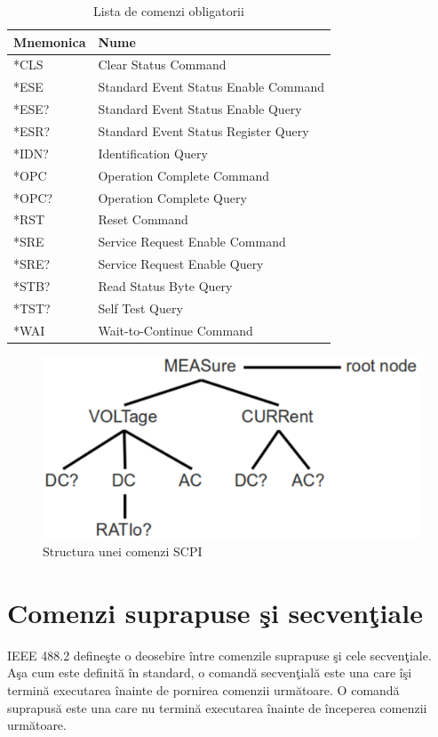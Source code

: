 \begin{table}[h]
	\begin{center}
	\begin{tabular}{|l|l|}
		\hline
		Mnemonica & Nume\\
		\hline
		*CLS & Clear Status Command\\
		*ESE & Standard Event Status Enable Command\\
		*ESE? & Standard Event Status Enable Query\\
		*ESR? & Standard Event Status Register Query\\
		*IDN? & Identification Query\\
		*OPC & Operation Complete Command\\
		*OPC? & Operation Complete Query\\
		*RST & Reset Command\\
		*SRE & Service Request Enable Command\\
		*SRE? & Service Request Enable Query\\
		*STB? & Read Status Byte Query\\
		*TST? & Self Test Query\\
		*WAI & Wait-to-Continue Command\\
		\hline
	\end{tabular}
	\end{center}
	\caption{Lista de comenzi obligatorii}
\end{table}

\begin{figure}[!htb]
	\centering
	\includegraphics[scale=0.8]{./Figuri/structuracomanda.eps}
	\caption{Structura unei comenzi SCPI}
	\label{structuracomanda}
\end{figure}

\section{Comenzi suprapuse \c{s}i secven\c{t}iale}
IEEE 488.2 define\c{s}te o deosebire \^{i}ntre comenzile suprapuse \c{s}i cele secven\c{t}iale. A\c{s}a cum este definit\u{a} \^{i}n standard, o comand\u{a} secven\c{t}ial\u{a} este una care \^{i}\c{s}i termin\u{a} executarea \^{i}nainte de pornirea comenzii urm\u{a}toare. O comand\u{a} suprapus\u{a} este una care nu termin\u{a} executarea \^{i}nainte de \^{i}nceperea comenzii urm\u{a}toare.

